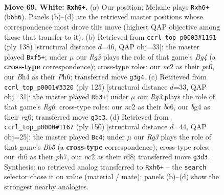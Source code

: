 \documentclass[11pt]{article}
\begin{document}
\clearpage

\begin{figure}[p]\centering
\begin{subfigure}{0.46\textwidth}\centering
\resizebox{\linewidth}{!}{%
\newchessgame
\chessboard[
  setfen={8/8/1R5r/7k/r5bB/6R1/2n2P2/7K w - - 17 69},
  showmover=false,
  pgfstyle=straightmove, color=movearrow, markmove={b6-h6}
]}
\caption{}
\end{subfigure}\hfill
\begin{subfigure}{0.46\textwidth}\centering
\resizebox{\linewidth}{!}{%
\newchessgame
\chessboard[
  setfen={8/8/2p3kP/2r2b2/6BK/8/5R2/8 w - - 1 70},
  showmover=false,
  pgfstyle=straightmove, color=movearrow, markmove={g4-f5}
]}
\caption{}
\end{subfigure}
\\[4pt]
\begin{subfigure}{0.46\textwidth}\centering
\resizebox{\linewidth}{!}{%
\newchessgame
\chessboard[
  setfen={8/8/2B3R1/7P/5p2/6r1/4k3/6bK b - - 8 63},
  showmover=false,
  pgfstyle=straightmove, color=movearrow, markmove={g3-h3}
]}
\caption{}
\end{subfigure}\hfill
\begin{subfigure}{0.46\textwidth}\centering
\resizebox{\linewidth}{!}{%
\newchessgame
\chessboard[
  setfen={3r3k/3bR2p/P6r/1B6/8/8/8/5RK1 w - - 1 76},
  showmover=false,
  pgfstyle=straightmove, color=movearrow, markmove={b5-c4}
]}
\caption{}
\end{subfigure}
\caption{\textbf{Move 69, White: \texttt{Rxh6+}.} (a) Our position; Melanie plays \texttt{Rxh6+} (\texttt{b6h6}). Panels (b)--(d) are the retrieved master positions whose correspondence most drove this move (highest QAP objective among those that transfer to it). (b) Retrieved from \texttt{ccrl\_top\_p0003\#1191} (ply 138) [structural distance $d$=46, QAP obj=33]: the master played \texttt{Bxf5+}; under $\mu$ our \emph{Rg3} plays the role of that game's \emph{Bg4} (a \textbf{cross-type} correspondence); cross-type roles: our \emph{n}c2 as their \emph{p}c6, our \emph{B}h4 as their \emph{P}h6; transferred move \texttt{g3g4}. (c) Retrieved from \texttt{ccrl\_top\_p0001\#3320} (ply 125) [structural distance $d$=33, QAP obj=31]: the master played \texttt{Rh3+}; under $\mu$ our \emph{Rg3} plays the role of that game's \emph{Rg6}; cross-type roles: our \emph{n}c2 as their \emph{b}c6, our \emph{b}g4 as their \emph{r}g6; transferred move \texttt{g3c3}. (d) Retrieved from \texttt{ccrl\_top\_p0000\#1167} (ply 150) [structural distance $d$=44, QAP obj=25]: the master played \texttt{Bc4}; under $\mu$ our \emph{Rg3} plays the role of that game's \emph{Bb5} (a \textbf{cross-type} correspondence); cross-type roles: our \emph{r}h6 as their \emph{p}h7, our \emph{n}c2 as their \emph{r}d8; transferred move \texttt{g3d3}. Synthesis: no retrieved analog transferred to \texttt{Rxh6+} -- the \texttt{search} selector chose it on value (material / mate); panels (b)--(d) show the strongest nearby analogies.}
\label{fig:thought-m136}
\end{figure}
\end{document}
